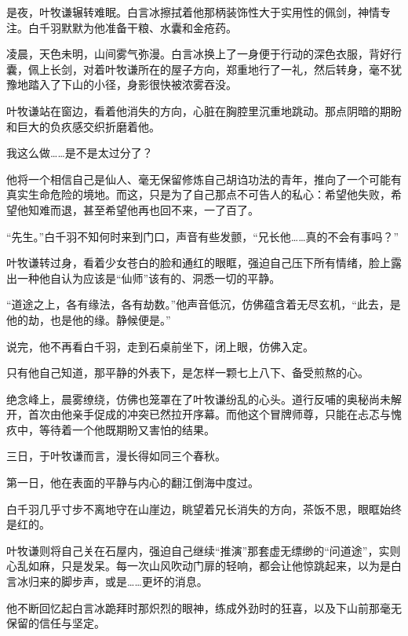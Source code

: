 是夜，叶牧谦辗转难眠。白言冰擦拭着他那柄装饰性大于实用性的佩剑，神情专注。白千羽默默为他准备干粮、水囊和金疮药。

凌晨，天色未明，山间雾气弥漫。白言冰换上了一身便于行动的深色衣服，背好行囊，佩上长剑，对着叶牧谦所在的屋子方向，郑重地行了一礼，然后转身，毫不犹豫地踏入了下山的小径，身影很快被浓雾吞没。

叶牧谦站在窗边，看着他消失的方向，心脏在胸腔里沉重地跳动。那点阴暗的期盼和巨大的负疚感交织折磨着他。

\vspace{2em}

我这么做……是不是太过分了？

\vspace{2em}

他将一个相信自己是仙人、毫无保留修炼自己胡诌功法的青年，推向了一个可能有真实生命危险的境地。而这，只是为了自己那点不可告人的私心：希望他失败，希望他知难而退，甚至希望他再也回不来，一了百了。

“先生。”白千羽不知何时来到门口，声音有些发颤，“兄长他……真的不会有事吗？”

叶牧谦转过身，看着少女苍白的脸和通红的眼眶，强迫自己压下所有情绪，脸上露出一种他自认为应该是“仙师”该有的、洞悉一切的平静。

“道途之上，各有缘法，各有劫数。”他声音低沉，仿佛蕴含着无尽玄机，“此去，是他的劫，也是他的缘。静候便是。”

说完，他不再看白千羽，走到石桌前坐下，闭上眼，仿佛入定。

只有他自己知道，那平静的外表下，是怎样一颗七上八下、备受煎熬的心。

绝念峰上，晨雾缭绕，仿佛也笼罩在了叶牧谦纷乱的心头。道行反哺的奥秘尚未解开，首次由他亲手促成的冲突已然拉开序幕。而他这个冒牌师尊，只能在忐忑与愧疚中，等待着一个他既期盼又害怕的结果。

\vspace{2em}

三日，于叶牧谦而言，漫长得如同三个春秋。

\vspace{2em}

第一日，他在表面的平静与内心的翻江倒海中度过。

白千羽几乎寸步不离地守在山崖边，眺望着兄长消失的方向，茶饭不思，眼眶始终是红的。

叶牧谦则将自己关在石屋内，强迫自己继续“推演”那套虚无缥缈的“问道途”，实则心乱如麻，只是发呆。每一次山风吹动门扉的轻响，都会让他惊跳起来，以为是白言冰归来的脚步声，或是……更坏的消息。

他不断回忆起白言冰跪拜时那炽烈的眼神，练成外劲时的狂喜，以及下山前那毫无保留的信任与坚定。

